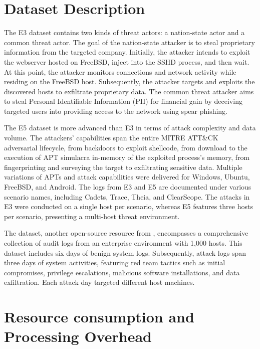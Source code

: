 \appendices

\section{Dataset Description}
\label{sec:dataset:description}

 The E3 dataset contains two kinds of threat actors: a nation-state actor and a common threat actor. The goal of the nation-state attacker is to steal proprietary information from the targeted company. Initially, the attacker intends to exploit the webserver hosted on FreeBSD, inject into the SSHD process, and then wait. At this point, the attacker monitors connections and network activity while residing on the FreeBSD host. Subsequently, the attacker targets and exploits the discovered hosts to exfiltrate proprietary data. The common threat attacker aims to steal Personal Identifiable Information (PII) for financial gain by deceiving targeted users into providing access to the network using spear phishing.

 The \darpa E5 dataset is more advanced than E3 in terms of attack complexity and data volume. The attackers' capabilities span the entire MITRE ATT\&CK~\cite{xiong2022cyber} adversarial lifecycle, from backdoors to exploit shellcode, from download to the execution of APT simulacra in-memory of the exploited process’s memory, from fingerprinting and surveying the target to exfiltrating sensitive data. Multiple variations of APTs and attack capabilities were delivered for Windows, Ubuntu, FreeBSD, and Android. The logs from E3 and E5 are documented under various scenario names, including Cadets, Trace, Theia, and ClearScope. The attacks in E3 were conducted on a single host per scenario, whereas E5 features three hosts per scenario, presenting a multi-host threat environment.

 The \optc dataset, another open-source resource from \darpa, encompasses a comprehensive collection of audit logs from an enterprise environment with 1,000 hosts. This dataset includes six days of benign system logs. Subsequently, attack logs span three days of system activities, featuring red team tactics such as initial compromises, privilege escalations, malicious software installations, and data exfiltration. Each attack day targeted different host machines.

\section{Resource consumption and Processing Overhead}
\label{sec:resource_consumption}

